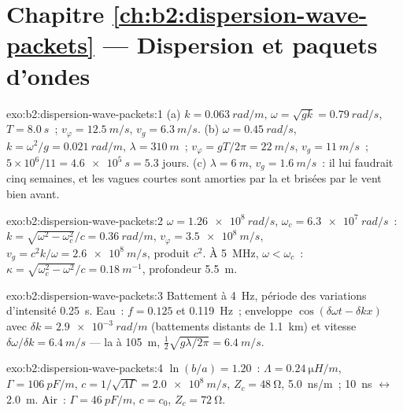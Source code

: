 \section*{Chapitre \ref{ch:b2:dispersion-wave-packets} --- Dispersion et paquets d'ondes}

\begin{solution}{exo:b2:dispersion-wave-packets:1}
(a) $k = \qty{0.063}{rad/m}$, $\omega = \sqrt{gk} = \qty{0.79}{rad/s}$, $T = \qty{8.0}{s}$~;
$v_\varphi = \qty{12.5}{m/s}$, $v_g = \qty{6.3}{m/s}$. (b) $\omega = \qty{0.45}{rad/s}$, $k = \omega^2
/g = \qty{0.021}{rad/m}$, $\lambda = \qty{310}{m}$~; $v_\varphi = gT/2\pi = \qty{22}{m/s}$, $v_g =
\qty{11}{m/s}$~; $5 \times 10^6/11 = \qty{4.6e5}{s} = 5.3$ jours. (c) $\lambda = \qty{6}{m}$, $v_g
= \qty{1.6}{m/s}$~: il lui faudrait cinq semaines, et les vagues courtes sont amorties
par la  et brisées par le vent bien avant.
\end{solution}

\begin{solution}{exo:b2:dispersion-wave-packets:2}
$\omega = \qty{1.26e8}{rad/s}$, $\omega_c = \qty{6.3e7}{rad/s}$~: $k = \sqrt{\omega^2 - \omega_c^2}/c =
\qty{0.36}{rad/m}$, $v_\varphi = \qty{3.5e8}{m/s}$, $v_g = c^2k/\omega = \qty{2.6e8}{m/s}$,
produit $c^2$. À \qty{5}{MHz}, $\omega < \omega_c$~: $\kappa = \sqrt{\omega_c^2 - \omega^2}/c =
\qty{0.18}{m^{-1}}$, profondeur \qty{5.5}{m}.
\end{solution}

\begin{solution}{exo:b2:dispersion-wave-packets:3}
Battement à \qty{4}{Hz}, période des variations d'intensité \qty{0.25}{s}. Eau~: $f = 0.125$ et
\qty{0.119}{Hz}~; enveloppe $\cos(\delta\omega t - \delta kx)$ avec $\delta k = \qty{2.9e-3}{rad/m}$
(battements distants de \qty{1.1}{km}) et vitesse $\delta\omega/\delta k = \qty{6.4}{m/s}$ --- la
 à \qty{105}{m}, $\tfrac12\sqrt{g\lambda/2\pi} = \qty{6.4}{m/s}$.
\end{solution}

\begin{solution}{exo:b2:dispersion-wave-packets:4}
$\ln(b/a) = 1.20$~: $\Lambda = \qty{0.24}{\micro H/m}$, $\Gamma = \qty{106}{pF/m}$, $c = 1/
\sqrt{\Lambda\Gamma} = \qty{2.0e8}{m/s}$, $Z_c = \qty{48}{\ohm}$, \qty{5.0}{ns/m}~; \qty{10}{ns}
$\leftrightarrow$ \qty{2.0}{m}. Air~: $\Gamma = \qty{46}{pF/m}$, $c = c_0$, $Z_c = \qty{72}{\ohm}$.
\end{solution}

